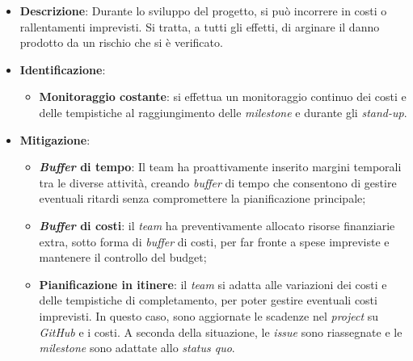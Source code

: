 \label{risk:costi e tempi imprevisti}
\begin{itemize}
	\item \textbf{Descrizione}:
	      Durante lo sviluppo del progetto, si può incorrere in costi o
	      rallentamenti imprevisti. Si tratta, a tutti gli effetti, di arginare
	      il danno prodotto da un rischio che si è verificato.
	\item \textbf{Identificazione}:
	      \begin{itemize}
		      \item \textbf{Monitoraggio costante}: si effettua un monitoraggio 
			  		continuo dei costi e delle tempistiche al raggiungimento delle 
					\textit{milestone} e durante gli \textit{stand-up}.
			  
	      \end{itemize}
	\item \textbf{Mitigazione}:
	      \begin{itemize}
		      \item \textbf{\textit{Buffer} di tempo}: Il team ha proattivamente 
			  		inserito margini temporali tra le diverse attività, creando 
					\textit{buffer} di tempo che consentono di gestire eventuali 
					ritardi senza compromettere la pianificazione principale;

		      \item \textbf{\textit{Buffer} di costi}: il \textit{team} ha 
			  		preventivamente allocato risorse finanziarie extra, 
					sotto forma di \textit{buffer} di costi, per far fronte 
					a spese impreviste e mantenere il controllo del budget;

		      \item \textbf{Pianificazione in itinere}: il \textit{team} si adatta
		            alle variazioni dei costi e delle tempistiche di
		            completamento, per poter gestire eventuali costi
		            imprevisti. In questo caso, sono aggiornate le scadenze
		            nel \textit{project} su \textit{GitHub} e i costi.
		            A seconda della situazione, le \textit{issue} sono
		            riassegnate e le \textit{milestone} sono adattate allo
		            \textit{status quo}.
	      \end{itemize}
\end{itemize}
